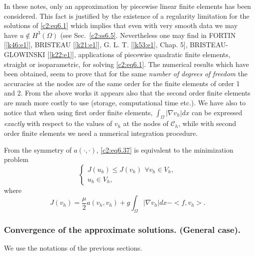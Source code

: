 \begin{remark}\label{c2:rem6.5} %
In these notes, only an approximation by piecewise linear finite
elements has been considered. This fact is justified by the existence
of a regularity limitation for the solutions of \eqref{c2:eq6.1} which
implies 
that even with very smooth data we may have $u \notin H^3 (\Omega)$
(see Sec.~\ref{c2:ss6.5}. Nevertheless one may find in FORTIN [\ref{k46:e1}],
BRISTEAU 
 [\ref{k21:e1}], G. L. T. [\ref{k53:e1}, Chap. 5], BRISTEAU-GLOWINSKI
 [\ref{k22:e1}],  applications of
piecewise quadratic finite elements, straight or isoparametric, for
solving \eqref{c2:eq6.1}. The numerical results which have been
obtained, seem 
to prove that for the same {\em number of degrees of freedom} the
accuracies at the nodes are of the same order for the finite elements
of order 1 and 2. From the above works it appears also that the second
order finite elements are much more costly to use (storage,
computational time etc.). We have also to notice that when using first
order finite elements, $\int_\Omega |\nabla v_h |dx$ can be
expressed {\em exactly} with respect to the values of $v_h$ at the
nodes of $\mathscr{C}_h$, while with second order finite elements we
need a numerical integration procedure.  
\end{remark}

\begin{remark}\label{c2:rem6.6}%
From the symmetry of $a (\cdot , \cdot)$, \eqref{c2:eq6.37} is
equivalent to the minimization problem 
\begin{equation}
\begin{cases}
J(u_h) \leq J (v_h) ~\, \forall  v_h \in V_h,\\
u_h \in V_h,
\end{cases}
\tag{6.38}\label{c2:eq6.38}
\end{equation}
where 
\begin{equation}
J(v_h) = \frac{\mu}{ 2} a (v_h , v_h) + g \int_\Omega |\nabla
v_h | dx - < f, v_h>. \tag{6.39}\label{c2:eq6.39} 
\end{equation}
\end{remark}

\subsubsection{Convergence of the approximate solutions. (General
  case).}\label{c2:sss6.7.2}  

We use the notations of the previous sections. 

